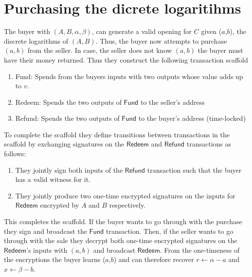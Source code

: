 \documentclass{article}
\begin{document}
\section{Purchasing the dicrete logaritihms}

\newcommand{\I}{\mathbf{I}}
\renewcommand{\i}{\mathbf{i}}
\newcommand{\addr}{\texttt{addr}}
\newcommand{\Tx}{\textsf{Tx}}
\newcommand{\Fund}{\textsf{Fund}}
\newcommand{\Refund}{\textsf{Refund}}
\newcommand{\Redeem}{\textsf{Redeem}}

The buyer with $(A,B,\alpha,\beta)$, can generate a valid opening for $C$ given ($a$,$b$), the discrete logarithms of $(A,B)$. Thus, the buyer now attempts to purchase $(a,b)$ from the seller. In case, the seller does not know $(a,b)$ the buyer must have their money returned. Thus they construct the following transaction scaffold

\begin{enumerate}
\item \Fund: Spends from the buyers inputs with two outputs whose value adds up to $v$.
\item \Redeem: Spends the two outputs of $\Fund$ to the seller's address
\item \Refund: Spends the two outputs of $\Fund$ to the buyer's address (time-locked)
\end{enumerate}

To complete the scaffold they define transitions between transactions in the scaffold by exchanging signatures on the $\Redeem$ and $\Refund$ transactions as follows:

\begin{enumerate}
\item They jointly sign both inputs of the $\Refund$ transaction such that the buyer has a valid witness for it.
\item They jointly produce two one-time encrypted signatures on the inputs for $\Redeem$ encrypted by $A$ and $B$ respectively.
\end{enumerate}

This completes the scaffold. If the buyer wants to go through with the purchase they sign and broadcast the $\Fund$ transaction. Then, if the seller wants to go through with the sale they decrypt both one-time encrypted signatures on the $\Redeem$'s inputs with $(a,b)$ and broadcast $\Redeem$. From the one-timeness of the encryptions the buyer learns ($a$,$b$) and can therefore recover $r \gets \alpha - a$ and $x \gets \beta - b$.

{}

\end{document}

